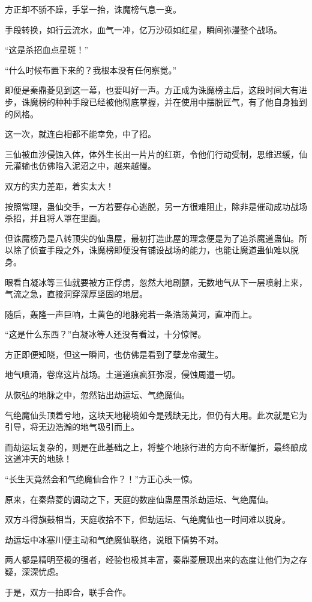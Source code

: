 \begin{this_body}
方正却不骄不躁，手掌一抬，诛魔榜气息一变。

手段转换，如行云流水，血气一冲，亿万沙硕如红星，瞬间弥漫整个战场。

“这是杀招血点星斑！”

“什么时候布置下来的？我根本没有任何察觉。”

即便是秦鼎菱见到这一幕，也要叫好一声。方正成为诛魔榜主后，这段时间大有进步，诛魔榜的种种手段已经被他彻底掌握，并在使用中摆脱匠气，有了他自身独到的风格。

这一次，就连白相都不能幸免，中了招。

三仙被血沙侵蚀入体，体外生长出一片片的红斑，令他们行动受制，思维迟缓，仙元灌输也仿佛陷入泥沼之中，越来越慢。

双方的实力差距，着实太大！

按照常理，蛊仙交手，一方若要存心逃脱，另一方很难阻止，除非是催动成功战场杀招，并且将人罩在里面。

但诛魔榜乃是八转顶尖的仙蛊屋，最初打造此屋的理念便是为了追杀魔道蛊仙。所以除了侦查手段之外，诛魔榜即便没有铺设战场的能力，也能让魔道蛊仙难以脱身。

眼看白凝冰等三仙就要被方正俘虏，忽然大地剧颤，无数地气从下一层喷射上来，气流之急，直接洞穿深厚坚固的地层。

随后，轰隆一声巨响，土黄色的地脉宛若一条浩荡黄河，直冲而上。

“这是什么东西？”白凝冰等人还没有看过，十分惊愕。

方正即便知晓，但这一瞬间，也仿佛是看到了孽龙帝藏生。

地气喷涌，卷席这片战场。土道道痕疯狂弥漫，侵蚀周遭一切。

从恢弘的地脉之中，忽然钻出劫运坛、气绝魔仙。

气绝魔仙头顶着兮地，这块天地秘境如今是残缺无比，但仍有大用。此次就是它为引导，将无边浩瀚的地气吸引而上。

而劫运坛复杂的，则是在此基础之上，将整个地脉行进的方向不断偏折，最终酿成这道冲天的地脉！

“长生天竟然会和气绝魔仙合作？！”方正心头一惊。

原来，在秦鼎菱的调动之下，天庭的数座仙蛊屋围杀劫运坛、气绝魔仙。

双方斗得旗鼓相当，天庭收拾不下，但劫运坛、气绝魔仙也一时间难以脱身。

劫运坛中冰塞川便主动和气绝魔仙联络，说眼下情势不对。

两人都是精明至极的强者，经验也极其丰富，秦鼎菱展现出来的态度让他们为之存疑，深深忧虑。

于是，双方一拍即合，联手合作。

\end{this_body}

